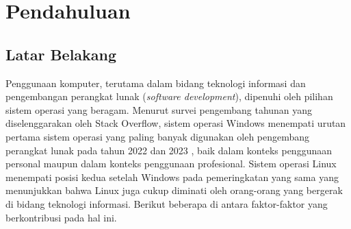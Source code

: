\chapter{Pendahuluan}

\section{Latar Belakang}

Penggunaan komputer, terutama dalam bidang teknologi informasi dan pengembangan perangkat lunak (\textit{software development}), dipenuhi oleh pilihan sistem operasi yang beragam. Menurut survei pengembang tahunan yang diselenggarakan oleh Stack Overflow, sistem operasi Windows menempati urutan pertama sistem operasi yang paling banyak digunakan oleh pengembang perangkat lunak pada tahun 2022 \cite{stackoverflow-developer-survey-2022-most-popular-os} dan 2023 \cite{stackoverflow-developer-survey-2023-most-popular-os}, baik dalam konteks penggunaan personal maupun dalam konteks penggunaan profesional. Sistem operasi Linux menempati posisi kedua setelah Windows pada pemeringkatan yang sama yang menunjukkan bahwa Linux juga cukup diminati oleh orang-orang yang bergerak di bidang teknologi informasi. Berikut beberapa di antara faktor-faktor yang berkontribusi pada hal ini.

